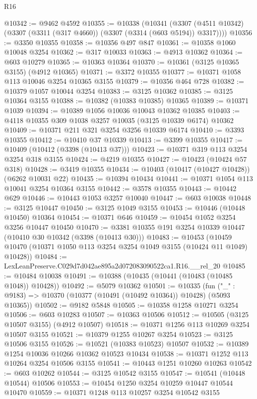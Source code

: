 \begin{lexlean}{R16}
\begin{coremodule}
@10342 := @9462 @4592
@10355 := @10338
    (@10341 (@3307 (@4511 @10342) (@3307 (@3311 (@317 @4660)) (@3307 (@3314 (@603 @5194)) @3317))))
@10356 := @3350 @10355
@10358 := @10356 @497 @847
@10361 := @10358 @1060 @10048 @3254
@10362 := @317 @10033
@10363 := @4913 @10362
@10364 := @603 @10279
@10365 := @10363 @10364
@10370 := @10361 (@3125 @10365 @3155) (@4912 @10365)
@10371 := @3372 @10355
@10377 := @10371 @1058 @113 @10046 @3254 @10365 @3155
@10379 := @10356 @464 @728
@10382 := @10379 @1057 @10044 @3254
@10383 := @3125 @10362
@10385 := @3125 @10364 @3155
@10388 := @10382 (@10383 @10385) @10365
@10389 := @10371 @1039
@10394 := @10389 @1056 @10036 @10043 @10362 @10385
@10403 := @4118 @10355 @309 @1038 @3257 @10035 (@3125 @10339 @6174) @10362
@10409 := @10371 @211 @321 @3254 @3256 @10339 @6174
@10410 := @3393 @10355
@10412 := @10410 @37 @10339
@10413 := @3399 @10355
@10417 := @10409 (@10412 (@3398 (@10413 @37)))
@10423 := @10371 @319 @113 @3254 @3254 @318 @3155
@10424 := @4219 @10355
@10427 := @10423 (@10424 @57 @318)
@10428 := @3419 @10355
@10434 := @10403 (@10417 (@10427 @10428)) (@6262 @10031 @22)
@10435 := @10394 @10434
@10441 := @10371 @1054 @113 @10041 @3254 @10364 @3155
@10442 := @3578 @10355
@10443 := @10442 @629
@10446 := @10443 @1053 @3257 @10040
@10447 := @603 @10038
@10448 := @3125 @10447
@10450 := @3125 @1049 @3155
@10453 := @10446 (@10448 @10450) @10364
@10454 := @10371 @646
@10459 := @10454 @1052 @3254 @3256 @10447 @10450
@10470 := @3381 @10355 @191 @3254 @10339 @10447 (@10410 @30 @10342 (@3398 (@10413 @30)))
@10483 := @10453
    (@10459 @10470 (@10371 @1050 @113 @3254 @3254 @1049 @3155 (@10424 @11 @1049) @10428))
@10484 := LexLeanPreserve.C029d7d042ae895a2d072083090522ca1.R16.__rel_20
@10485 := @10484 @10038
@10491 := @10388 (@10435 (@10441 (@10483 (@10485 @1048)) @10428))
@10492 := @5079 @10362
@10501 := @10335
    (fun ("_" : @9183) => @10370 (@10377 (@10491 (@10492 @10364)) @10428) (@5093 @10365))
@10502 := @9182 @5848
@10505 := @10358 @1258 @10271 @3254
@10506 := @603 @10283
@10507 := @10363 @10506
@10512 := @10505 (@3125 @10507 @3155) (@4912 @10507)
@10518 := @10371 @1256 @113 @10269 @3254 @10507 @3155
@10521 := @10379 @1255 @10267 @3254
@10523 := @3125 @10506 @3155
@10526 := @10521 (@10383 @10523) @10507
@10532 := @10389 @1254 @10036 @10266 @10362 @10523 @10434
@10538 := @10371 @1252 @113 @10264 @3254 @10506 @3155
@10541 := @10443 @1251 @10260 @10263
@10542 := @603 @10262
@10544 := @3125 @10542 @3155
@10547 := @10541 (@10448 @10544) @10506
@10553 := @10454 @1250 @3254 @10259 @10447 @10544 @10470
@10559 := @10371 @1248 @113 @10257 @3254 @10542 @3155

\end{coremodule}
\end{lexlean}
